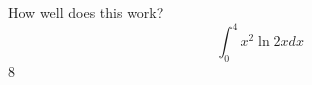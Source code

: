 \documentclass{article}
\begin{document}
How well does this work?
$$\int_0^4 x^2 \ln{2x}dx$$
8
\end{document}
